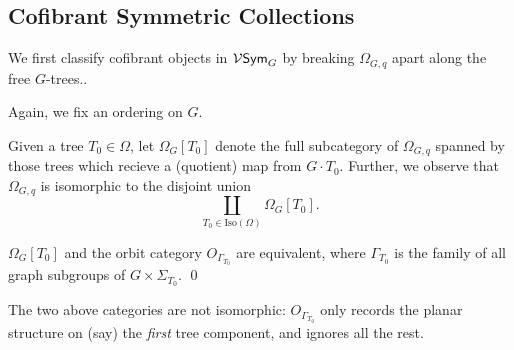 \documentclass[a4paper,10pt]{article}%
\begin{document}
\subsection{Cofibrant Symmetric Collections}


We first classify cofibrant objects in $\mathcal V\mathsf{Sym}_G$ by breaking $\Omega_{G,q}$ apart along the free $G$-trees.. 

Again, we fix an ordering on $G$.
\begin{definition}
  Given a tree $T_0 \in \Omega$, let $\Omega_G[T_0]$ denote the full subcategory of $\Omega_{G,q}$ spanned by those trees which recieve a (quotient) map from $G\cdot T_0$. Further, we observe that $\Omega_{G,q}$ is isomorphic to the disjoint union
  \[
  \mathop{\coprod}\limits_{T_0 \in \mathrm{Iso}(\Omega)}\Omega_G[T_0].
  \]
\end{definition}

\begin{lemma}
  \label{O_GAMMA_T_0_LEMMA}
  $\Omega_G[T_0]$ and the orbit category $O_{\Gamma_{T_0}}$ are equivalent, where $\Gamma_{T_0}$ is the family of all graph subgroups of $G\times \Sigma_{T_0}$. \qed
\end{lemma}
The two above categories are not isomorphic: $O_{\Gamma_{T_0}}$ only records the planar structure on (say) the \textit{first} tree component, and ignores all the rest.



\end{document}
